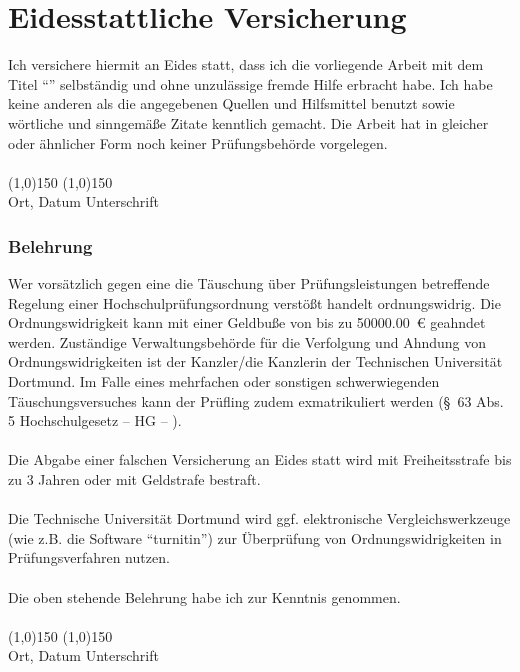 \chapter*{Eidesstattliche Versicherung}
\thispagestyle{empty}

\vspace*{1cm}
\noindent
Ich versichere hiermit an Eides statt, dass ich die vorliegende Arbeit
mit dem Titel
\makeatletter
\enquote{{\@title}}
\makeatother
selbständig und ohne unzulässige fremde Hilfe erbracht habe.
Ich habe keine anderen als die angegebenen Quellen und Hilfsmittel benutzt
sowie wörtliche und sinngemäße Zitate kenntlich gemacht.
Die Arbeit hat in gleicher oder ähnlicher Form noch keiner
Prüfungsbehörde vorgelegen.
\vspace*{1cm}
\ \\
\ \\
\line(1,0){150} \hfill \line(1,0){150}\\
Ort, Datum \hfill Unterschrift \hspace*{3cm}
\vspace*{1.5cm}

\subsection*{Belehrung}
Wer vorsätzlich gegen eine die Täuschung über Prüfungsleistungen
betreffende Regelung einer Hochschulprüfungsordnung verstößt handelt
ordnungswidrig.
Die Ordnungswidrigkeit kann mit einer Geldbuße von bis zu
\SI{50000,00}{\euro} geahndet werden. Zuständige Verwaltungsbehörde
für die Verfolgung und Ahndung von Ordnungswidrigkeiten ist
der Kanzler/die Kanzlerin der Technischen Universität Dortmund.
Im Falle eines mehrfachen oder sonstigen schwerwiegenden
Täuschungsversuches kann der Prüfling zudem exmatrikuliert werden
(\S\ 63 Abs. 5 Hochschulgesetz -- HG -- ).\\
\ \\
Die Abgabe einer falschen Versicherung an Eides statt wird mit
Freiheitsstrafe bis zu 3 Jahren oder mit Geldstrafe bestraft.\\
\ \\
Die Technische Universität Dortmund wird ggf. elektronische
Vergleichswerkzeuge (wie z.B. die Software \enquote{turnitin}) zur Überprüfung
von Ordnungswidrigkeiten in Prüfungsverfahren nutzen.\\
\ \\
Die oben stehende Belehrung habe ich zur Kenntnis genommen.
\vspace*{1cm}
\ \\
\ \\
\line(1,0){150} \hfill \line(1,0){150}\\
Ort, Datum \hfill Unterschrift \hspace*{3cm}
\vspace*{\fill}
